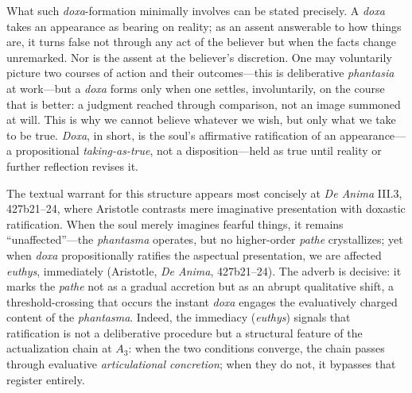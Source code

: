 What such \textit{doxa}-formation minimally involves can be stated precisely. A \textit{doxa} takes an appearance as bearing on reality; as an assent answerable to how things are, it turns false not through any act of the believer but when the facts change unremarked. Nor is the assent at the believer's discretion. One may voluntarily picture two courses of action and their outcomes---this is deliberative \textit{phantasia} at work---but a \textit{doxa} forms only when one settles, involuntarily, on the course that is better: a judgment reached through comparison, not an image summoned at will. This is why we cannot believe whatever we wish, but only what we take to be true. \textit{Doxa}, in short, is the soul's affirmative ratification of an appearance---a propositional \textit{taking-as-true}, not a disposition---held as true until reality or further reflection revises it.

The textual warrant for this structure appears most concisely at \textit{De Anima} III.3, 427b21--24, where Aristotle contrasts mere imaginative presentation with doxastic ratification. When the soul merely imagines fearful things, it remains ``unaffected''---the \textit{phantasma} operates, but no higher-order \textit{pathe} crystallizes; yet when \textit{doxa} propositionally ratifies the aspectual presentation, we are affected \textit{euthys}, immediately (Aristotle, \textit{De Anima}, 427b21--24). The adverb is decisive: it marks the \textit{pathe} not as a gradual accretion but as an abrupt qualitative shift, a threshold-crossing that occurs the instant \textit{doxa} engages the evaluatively charged content of the \textit{phantasma}. Indeed, the immediacy (\textit{euthys}) signals that ratification is not a deliberative procedure but a structural feature of the actualization chain at $A_3$: when the two conditions converge, the chain passes through evaluative \textit{articulational concretion}; when they do not, it bypasses that register entirely.

